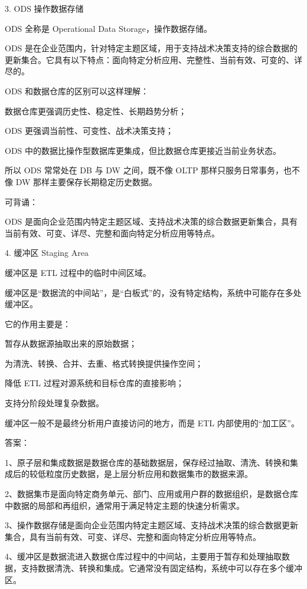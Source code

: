\documentclass[UTF8,zihao=-4]{ctexart}
\begin{document}
3. ODS 操作数据存储\par

ODS 全称是 Operational Data Storage，操作数据存储。\par

ODS 是在企业范围内，针对特定主题区域，用于支持战术决策支持的综合数据的更新集合。它具有以下特点：面向特定分析应用、完整性、当前有效、可变的、详尽的。\par

ODS 和数据仓库的区别可以这样理解：\par

数据仓库更强调历史性、稳定性、长期趋势分析；\par
ODS 更强调当前性、可变性、战术决策支持；\par
ODS 中的数据比操作型数据库更集成，但比数据仓库更接近当前业务状态。\par

所以 ODS 常常处在 DB 与 DW 之间，既不像 OLTP 那样只服务日常事务，也不像 DW 那样主要保存长期稳定历史数据。\par

可背诵：\par
ODS 是面向企业范围内特定主题区域、支持战术决策的综合数据更新集合，具有当前有效、可变、详尽、完整和面向特定分析应用等特点。\par

4. 缓冲区 Staging Area\par

缓冲区是 ETL 过程中的临时中间区域。\par

缓冲区是“数据流的中间站”，是“白板式”的，没有特定结构，系统中可能存在多处缓冲区。\par

它的作用主要是：\par

暂存从数据源抽取出来的原始数据；\par
为清洗、转换、合并、去重、格式转换提供操作空间；\par
降低 ETL 过程对源系统和目标仓库的直接影响；\par
支持分阶段处理复杂数据。\par

缓冲区一般不是最终分析用户直接访问的地方，而是 ETL 内部使用的“加工区”。\par

答案：\par
1、原子层和集成数据是数据仓库的基础数据层，保存经过抽取、清洗、转换和集成后的较低粒度历史数据，是上层分析应用和数据集市的数据来源。\par
2、数据集市是面向特定商务单元、部门、应用或用户群的数据组织，是数据仓库中数据的局部和再组织，通常用于满足特定主题的快速分析需求。\par
3、操作数据存储是面向企业范围内特定主题区域、支持战术决策的综合数据更新集合，具有当前有效、可变、详尽、完整和面向特定分析应用等特点。\par
4、缓冲区是数据流进入数据仓库过程中的中间站，主要用于暂存和处理抽取数据，支持数据清洗、转换和集成。它通常没有固定结构，系统中可以存在多个缓冲区。\par
\end{document}
